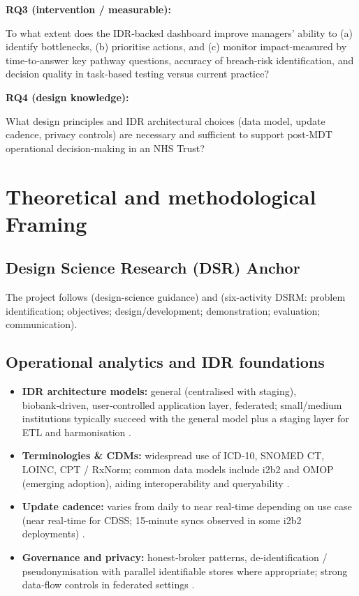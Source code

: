 \documentclass[12pt, a4paper, twoside]{article} %
\begin{document}
\textbf{RQ3 (intervention / measurable):}

To what extent does the IDR‑backed dashboard improve managers’ ability to (a) identify bottlenecks, (b) prioritise actions, and (c) monitor impact-measured by time‑to‑answer key pathway questions, accuracy of breach‑risk identification, and decision quality in task‑based testing versus current practice?

\textbf{RQ4 (design knowledge):}

What design principles and IDR architectural choices (data model, update cadence, privacy controls) are necessary and sufficient to support post‑MDT operational decision‑making in an NHS Trust?

\section{Theoretical and methodological Framing}
\subsection{Design Science Research (DSR) Anchor}

The project follows \cite{hevner2004} (design-science guidance) and \cite{Peffers2007} (six-activity DSRM: problem identification; objectives; design/development; demonstration; evaluation; communication).

\subsection{Operational analytics and IDR foundations}

\begin{itemize}
  \item \textbf{IDR architecture models:} general (centralised with staging), biobank‑driven, user‑controlled application layer, federated; small/medium institutions typically succeed with the general model plus a staging layer for ETL and harmonisation \citep{gagalova2020}.
  \item \textbf{Terminologies \& CDMs:} widespread use of ICD‑10, SNOMED CT, LOINC, CPT / RxNorm; common data models include i2b2 and OMOP (emerging adoption), aiding interoperability and queryability \citep{gagalova2020}.
  \item \textbf{Update cadence:} varies from daily to near real‑time depending on use case (near real‑time for CDSS; 15‑minute syncs observed in some i2b2 deployments) \citep{gagalova2020}.
  \item \textbf{Governance and privacy:} honest‑broker patterns, de‑identification / pseudonymisation with parallel identifiable stores where appropriate; strong data‑flow controls in federated settings \citep{gagalova2020}.
\end{itemize}
\end{document}
